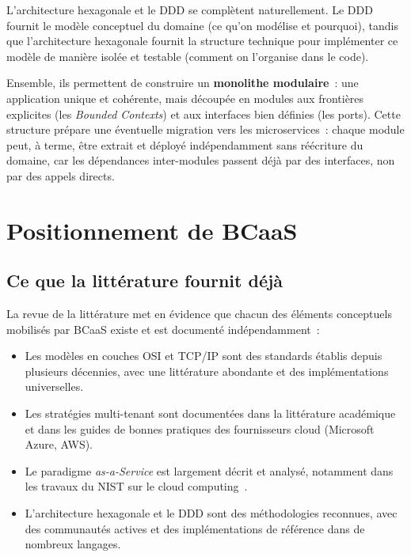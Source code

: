 L'architecture hexagonale et le DDD se complètent naturellement. Le DDD fournit le modèle
conceptuel du domaine (ce qu'on modélise et pourquoi), tandis que l'architecture
hexagonale fournit la structure technique pour implémenter ce modèle de manière isolée et
testable (comment on l'organise dans le code).

Ensemble, ils permettent de construire un \textbf{monolithe modulaire}~: une application
unique et cohérente, mais découpée en modules aux frontières explicites (les
\textit{Bounded Contexts}) et aux interfaces bien définies (les ports). Cette structure
prépare une éventuelle migration vers les microservices~: chaque module peut, à terme,
être extrait et déployé indépendamment sans réécriture du domaine, car les dépendances
inter-modules passent déjà par des interfaces, non par des appels directs.

\section{Positionnement de BCaaS}
\label{sec:positionnement}

\subsection{Ce que la littérature fournit déjà}
\label{subsec:litterature-existante}

La revue de la littérature met en évidence que chacun des éléments conceptuels mobilisés
par BCaaS existe et est documenté indépendamment~:

\begin{itemize}
  \item Les modèles en couches OSI et TCP/IP sont des standards établis depuis plusieurs
        décennies, avec une littérature abondante et des implémentations universelles.
  \item Les stratégies multi-tenant sont documentées dans la littérature académique et dans
        les guides de bonnes pratiques des fournisseurs cloud (Microsoft Azure, AWS).
  \item Le paradigme \textit{as-a-Service} est largement décrit et analysé, notamment dans
        les travaux du NIST sur le cloud computing~\cite{nist}.
  \item L'architecture hexagonale et le DDD sont des méthodologies reconnues, avec des
        communautés actives et des implémentations de référence dans de nombreux langages.
\end{itemize}

